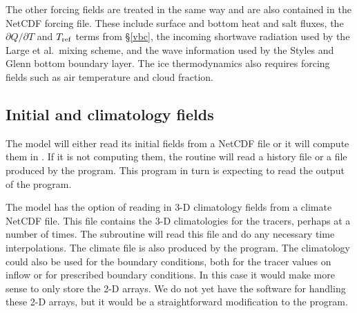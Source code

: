 The other forcing fields are treated in the same way and are also
contained in the NetCDF forcing file.  These include surface and bottom
heat and salt fluxes, the $\partial Q / \partial T$ and $T_{\rm ref}$
terms from \S\ref{vbc}, the incoming shortwave radiation used by the
Large et al.\ mixing scheme, and the wave information used by the
Styles and Glenn bottom boundary layer.  The ice thermodynamics also
requires forcing fields such as air temperature and cloud fraction.


\subsection{Initial and climatology fields}
The model will either read its initial fields from a NetCDF file or it
will compute them in .  If it is not computing them,
the routine  will read a history file or a file
produced by the  program.  This program in turn is
expecting to read the output of the  program.

The model has the option of reading in 3-D climatology fields from a
climate NetCDF file.  This file contains the 3-D climatologies for the
tracers, perhaps at a number of times.  The subroutine 
will read this file and do any necessary time interpolations.  The
climate file is also produced by the  program.  The
climatology could also be used for the boundary conditions, both for
the tracer values on inflow or for prescribed boundary conditions.  In
this case it would make more sense to only store the 2-D arrays.  We do
not yet have the software for handling these 2-D arrays, but it would
be a straightforward modification to the  program.
